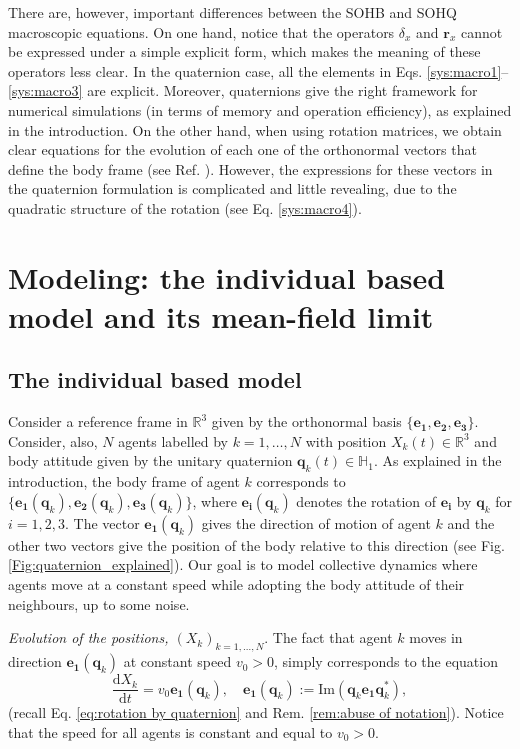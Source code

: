 \documentclass[12pt]{article}
\def\R{\mathbb{R}}
\newcommand{\vezero}{\mathbf{e_{1}}}
\newcommand{\ud}{\mathrm{d}}
\newcommand{\unitq}{{\mathbb{H}_1}}
\newcommand{\Ima}{\mbox{Im}}
\newcommand{\q}{\mathbf{q}}
\newcommand{\qk}{\mathbf{q}_k}
\newcommand{\rvec}{\mathbf{r}}
\begin{document}
There are, however, important differences between the SOHB and SOHQ macroscopic equations. On one hand, notice that the operators $\delta_x$ and $\rvec_x$ cannot be expressed under a simple explicit form, which makes the meaning of these operators less clear. In the quaternion case, all the elements in Eqs. \eqref{sys:macro1}--\eqref{sys:macro3} are explicit. Moreover, quaternions give the right framework for numerical simulations (in terms of memory and operation efficiency), as explained in the introduction. On the other hand, when using rotation matrices, we obtain clear equations for the evolution of each one of the orthonormal vectors that define the body frame (see Ref. \cite{bodyattitude}). However, the expressions for these vectors  in the quaternion formulation  is complicated and little revealing, due to the quadratic structure of the rotation (see Eq. \eqref{sys:macro4}).




\section{Modeling: the individual based model and its mean-field limit}
\label{sec:modeling}


\subsection{The individual based model}

Consider a reference frame in $\R^3$ given by the orthonormal basis $\{\vezero, \mathbf{e_2}, \mathbf{e_3}\}$.  Consider, also, $N$ agents labelled by $k=1,\hdots, N$ with position $X_k(t)\in \R^3$ and body attitude given by the unitary quaternion $\q_k(t)\in \unitq$. As explained in the introduction, the body frame of agent $k$ corresponds to $\{\vezero(\qk), \mathbf{e_2}(\qk), \mathbf{e_3}(\qk) \}$, where $\mathbf{e_i}(\qk)$ denotes the rotation of $\mathbf{e_i}$ by $\qk$ for $i=1,2,3$.  The vector $\vezero(\qk)$ gives the direction of motion of agent $k$ and the other two vectors give the position of the body relative to this direction (see Fig. \ref{Fig:quaternion_explained}).
Our goal is to model collective dynamics where agents move at a constant speed while adopting the body attitude of their neighbours, up to some noise.

\medskip

\textit{Evolution of the positions, $(X_k)_{k=1,\hdots,N}$}. The fact that agent $k$ moves in direction $\vezero(\qk)$ at constant speed $v_0>0$, simply corresponds to the equation
$$\frac{\ud X_k}{\ud t} = v_0 \vezero(\qk), \quad \vezero(\qk):= \Ima(\qk \vezero \qk^*),$$
(recall Eq. \eqref{eq:rotation by quaternion} and Rem. \ref{rem:abuse of notation}).
Notice that the speed for all agents is constant and equal to $v_0>0$.
\end{document}
